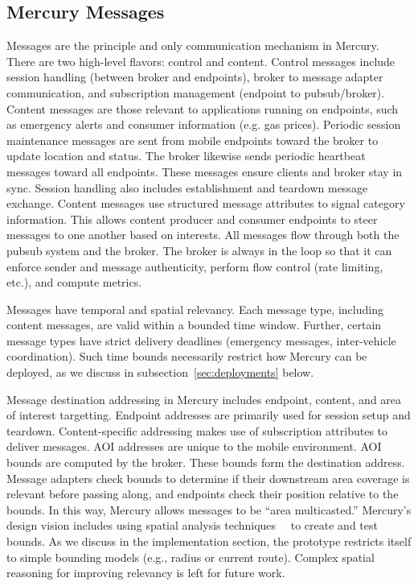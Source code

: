 \subsection{Mercury Messages}

Messages are the principle and only communication mechanism in
Mercury. There are two high-level flavors: control and
content. Control messages include session handling (between broker and
endpoints), broker to message adapter communication, and subscription
management (endpoint to pubsub/broker).  Content messages are those
relevant to applications running on endpoints, such as emergency
alerts and consumer information (e.g. gas prices).  Periodic session
maintenance messages are sent from mobile endpoints toward the broker
to update location and status.  The broker likewise sends periodic
heartbeat messages toward all endpoints. These messages ensure clients
and broker stay in sync. Session handling also includes establishment
and teardown message exchange.  Content messages use structured
message attributes to signal category information. This allows content
producer and consumer endpoints to steer messages to one another based
on interests. All messages flow through both the pubsub system and the
broker. The broker is always in the loop so that it can enforce sender
and message authenticity, perform flow control (rate limiting, etc.),
and compute metrics.

Messages have temporal and spatial relevancy.  Each message type,
including content messages, are valid within a bounded time
window. Further, certain message types have strict delivery deadlines
(emergency messages, inter-vehicle coordination). Such time bounds
necessarily restrict how Mercury can be deployed, as we discuss in
subsection~\ref{sec:deployments} below.

Message destination addressing in Mercury includes endpoint, content,
and area of interest targetting. Endpoint addresses are primarily used
for session setup and teardown. Content-specific addressing makes use
of subscription attributes to deliver messages. AOI addresses are
unique to the mobile environment. AOI bounds are computed by the
broker. These bounds form the destination address. Message adapters
check bounds to determine if their downstream area coverage is
relevant before passing along, and endpoints check their position
relative to the bounds.  In this way, Mercury allows messages to be
``area multicasted.''  Mercury's design vision includes using spatial
analysis techniques~\cite{sp-an1}~\cite{sp-an2} to create and test
bounds.  As we discuss in the implementation section, the prototype
restricts itself to simple bounding models (e.g., radius or current
route). Complex spatial reasoning for improving relevancy is left for
future work.

